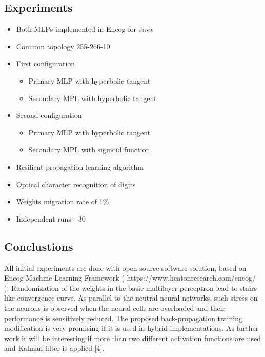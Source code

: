 \documentclass[a0,portrait,25pt]{sciposter}
\begin{document}
\begin{multicols}{3}
\begin{mdframed}[backgroundcolor=white,roundcorner=4pt,shadow=true,linewidth=1pt]
\color{Black}
\section*{Experiments}
\begin{itemize}
\item Both MLPs implemented in Encog for Java
\item Common topology 255-266-10
\item First configuration
\begin{itemize}
  \item Primary MLP with hyperbolic tangent
  \item Secondary MPL with hyperbolic tangent
\end{itemize}
\item Second configuration
\begin{itemize}
  \item Primary MLP with hyperbolic tangent
  \item Secondary MPL with sigmoid function
\end{itemize}
\item Resilient propagation learning algorithm
\item Optical character recognition of digits
\item Weights migration rate of 1\%
\item Independent runs - 30
\end{itemize}
\end{mdframed}

\begin{mdframed}[backgroundcolor=white,roundcorner=4pt,shadow=true,linewidth=1pt]
\color{Black}
\section*{Conclustions}
All initial experiments are done with open source software solution, based on Encog Machine Learning Framework ( https://www.heatonresearch.com/encog/ ). Randomization of the weights in the basic multilayer perceptron lead to stairs like convergence curve. As parallel to the neutral neural networks, such stress on the neurons is observed when the neural cells are overloaded and their performance is sensitively reduced. The proposed back-propagation training modification is very promising if it is used in hybrid implementations. As further work it will be interesting if more than two different activation functions are used and Kalman filter is applied [4]. 
\end{mdframed}


\end{multicols}
\end{document}

